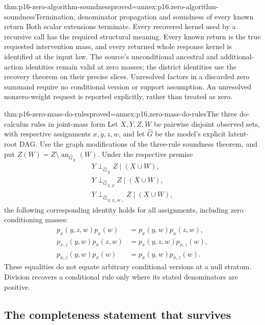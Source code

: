 \begin{hbtheorem}{thm:p16-zero-algorithm-soundness}{proved=annex:p16.zero-algorithm-soundness}{Termination, denominator propagation and soundness of every known return}
Both scalar extensions terminate. Every recovered kernel used by a
recursive call has the required structural meaning. Every known return
is the true requested intervention mass, and every returned whole
response kernel is identified at the input law. The source's unconditional
ancestral and additional-action identities remain valid at zero masses;
the district identities use the recovery theorem on their precise slices.
Unresolved factors in a discarded zero summand require no conditional
version or support assumption. An unresolved nonzero-weight request is
reported explicitly, rather than treated as zero.
\end{hbtheorem}

\begin{hbtheorem}{thm:p16-zero-mass-do-rules}{proved=annex:p16.zero-mass-do-rules}{The three do-calculus rules in joint-mass form}
Let \(X,Y,Z,W\) be pairwise disjoint observed sets, with respective
assignments \(x,y,z,w\), and let \(\widehat G\) be the model's
explicit latent-root DAG. Use the graph modifications of the three-rule
soundness theorem, and put
\(Z(W)=Z\setminus\operatorname{an}_{\widehat G_{\overline X}}(W)\).
Under the respective premise
\[
\begin{gathered}
 Y\mathrel{\perp_{\widehat G_{\overline X}}}Z\mid(X\cup W),
 \\
 Y\mathrel{\perp_{\widehat G_{\overline X,\underline Z}}}Z\mid(X\cup W),
 \\
 Y\mathrel{\perp_{\widehat G_{\overline X,\overline{Z(W)}}}}Z\mid(X\cup W),
\end{gathered}
\]
the following corresponding identity holds for all assignments,
including zero conditioning masses:
\[
 \begin{split}
 p_x(y,z,w)p_x(w)&=p_x(y,w)p_x(z,w),\\
 p_{x,z}(y,w)p_x(z,w)&=p_x(y,z,w)p_{x,z}(w),\\
 p_{x,z}(y,w)p_x(w)&=p_x(y,w)p_{x,z}(w).
 \end{split}
\]
These equalities do not equate arbitrary conditional versions at a null
stratum. Division recovers a conditional rule only where its stated
denominators are positive.
\end{hbtheorem}

\subsection{The completeness statement that survives}

